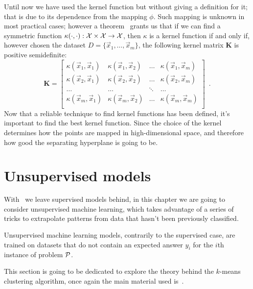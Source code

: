 Until now we have used the kernel function but without giving a definition for it; that is due to its
dependence from the mapping $\phi$. Such mapping is unknown in most practical cases; however a
theorem~\cite{learning-with-kernels} grants us that if we can find a symmetric function
$\kappa(\cdot, \cdot): \mathcal{X} \times \mathcal{X} \rightarrow \mathcal{X}$, then $\kappa$ is a kernel function if and
only if, however chosen the dataset $D = \{\vec{x}_1, \allowbreak\ldots\allowbreak, \vec{x}_m\}$,
the following kernel matrix $\mathbf{K}$ is positive semidefinite:
\begin{equation}
	\label{eq:kernel-matrix}
	\mathbf{K} =
	\begin{bmatrix}
		\kappa(\vec{x}_1, \vec{x}_1) & \kappa(\vec{x}_1, \vec{x}_2) & \ldots &
		\kappa(\vec{x}_1, \vec{x}_m)                                                  \\
		\kappa(\vec{x}_2, \vec{x}_1) & \kappa(\vec{x}_2, \vec{x}_2) & \ldots &
		\kappa(\vec{x}_2, \vec{x}_m)                                                  \\
		\ldots                       & \ldots                       & \ddots & \ldots \\
		\kappa(\vec{x}_m, \vec{x}_1) & \kappa(\vec{x}_m, \vec{x}_2) & \ldots &
		\kappa(\vec{x}_m, \vec{x}_m)                                                  \\
	\end{bmatrix} \enspace.
\end{equation}
Now that a reliable technique to find kernel functions has been defined, it's important to find the
best kernel function. Since the choice of the kernel determines how the points are mapped in
high-dimensional space, and therefore how good the separating hyperplane is going to be.

\section{Unsupervised models}
\label{sec:uml}
With \svms\ we leave supervised models behind, in this chapter we are going to consider unsupervised
machine learning, which takes advantage of a series of tricks to extrapolate patterns from data that
hasn't been previously classified.

Unsupervised machine learning models, contrarily to the supervised case, are trained on datasets
that do not contain an expected answer $y_i$ for the $i$th instance of problem $\mathcal{P}$.

This section is going to be dedicated to explore the theory behind the $k$-means clustering
algorithm, once again the main material used is~\cite{ZhouZhi-Hua2021ML}.

